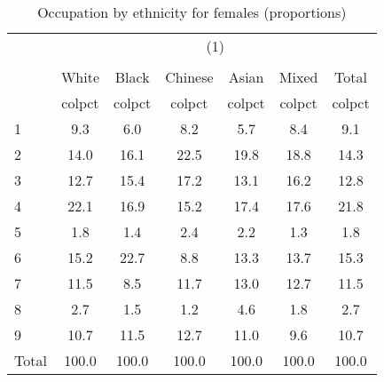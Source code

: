 \begin{table}[htbp]\centering
\def\sym#1{\ifmmode^{#1}\else\(^{#1}\)\fi}
\caption{Occupation by ethnicity for females (proportions)}
\begin{tabular}{l*{6}{c}}
\hline\hline
          &\multicolumn{6}{c}{(1)}                                    \\
          &\multicolumn{6}{c}{}                                       \\
          &    White&    Black&  Chinese&    Asian&    Mixed&    Total\\
          &   colpct&   colpct&   colpct&   colpct&   colpct&   colpct\\
\hline
1         &      9.3&      6.0&      8.2&      5.7&      8.4&      9.1\\
2         &     14.0&     16.1&     22.5&     19.8&     18.8&     14.3\\
3         &     12.7&     15.4&     17.2&     13.1&     16.2&     12.8\\
4         &     22.1&     16.9&     15.2&     17.4&     17.6&     21.8\\
5         &      1.8&      1.4&      2.4&      2.2&      1.3&      1.8\\
6         &     15.2&     22.7&      8.8&     13.3&     13.7&     15.3\\
7         &     11.5&      8.5&     11.7&     13.0&     12.7&     11.5\\
8         &      2.7&      1.5&      1.2&      4.6&      1.8&      2.7\\
9         &     10.7&     11.5&     12.7&     11.0&      9.6&     10.7\\
Total     &    100.0&    100.0&    100.0&    100.0&    100.0&    100.0\\
\hline\hline
\end{tabular}
\end{table}
